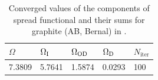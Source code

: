 \begin{table}[h!]
	\centering
	\captionsetup{width=.5\textwidth}
	\caption{Converged values of the components of spread functional and their sums for graphite (AB, Bernal) in \angsqd{}.}
	\begin{tabular}{@{} lllll @{}}\toprule[1.5pt]
	$\Omega$ & $\Omega\tinysub{I}$ & $\Omega\tinysub{OD}$ & $\Omega\tinysub{D}$ & $N_{\mathrm{iter}}$ \\\midrule
	7.3809 & 5.7641 & 1.5874 & 0.0293 & 100 \\\bottomrule[1pt]
	\end{tabular}\label{tab10.1}
\end{table}
